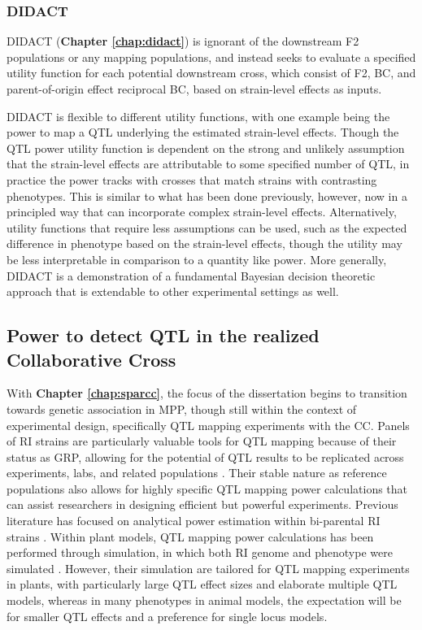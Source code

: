 \subsubsection{DIDACT}

DIDACT (\textbf{Chapter \ref{chap:didact}}) is ignorant of the downstream F2 populations or any mapping populations, and instead seeks to evaluate a specified utility function for each potential downstream cross, which consist of F2, BC, and parent-of-origin effect reciprocal BC, based on strain-level effects as inputs. 

DIDACT is flexible to different utility functions, with one example being the power to map a QTL underlying the estimated strain-level effects. Though the QTL power utility function is dependent on the strong and unlikely assumption that the strain-level effects are attributable to some specified number of QTL, in practice the power tracks with crosses that match strains with contrasting phenotypes. This is similar to what has been done previously, however, now in a principled way that can incorporate complex strain-level effects. Alternatively, utility functions that require less assumptions can be used, such as the expected difference in phenotype based on the strain-level effects, though the utility may be less interpretable in comparison to a quantity like power. More generally, DIDACT is a demonstration of a fundamental Bayesian decision theoretic approach that is extendable to other experimental settings as well.

\subsection{Power to detect QTL in the realized Collaborative Cross}

With \textbf{Chapter \ref{chap:sparcc}}, the focus of the dissertation begins to transition towards genetic association in MPP, though still within the context of experimental design, specifically QTL mapping experiments with the CC. Panels of RI strains are particularly valuable tools for QTL mapping because of their status as GRP, allowing for the potential of QTL results to be replicated across experiments, labs, and related populations \citep{Belknap2001}. Their stable nature as reference populations also allows for highly specific QTL mapping power calculations that can assist researchers in designing efficient but powerful experiments. Previous literature has focused on analytical power estimation within bi-parental RI strains \citep{Kaeppler1997}. Within plant models, QTL mapping power calculations has been performed through simulation, in which both RI genome and phenotype were simulated \citep{Falke2011,Takuno2012}. However, their simulation are tailored for QTL mapping experiments in plants, with particularly large QTL effect sizes and elaborate multiple QTL models, whereas in many phenotypes in animal models, the expectation will be for smaller QTL effects and a preference for single locus models.

